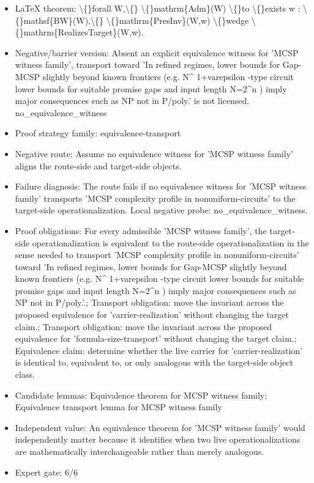 \documentclass[11pt]{article}
\begin{document}
\begin{itemize}
\item LaTeX theorem: \textbackslash\{\}forall W,\textbackslash\{\} \textbackslash\{\}mathrm\{Adm\}(W) \textbackslash\{\}to \textbackslash\{\}exists w : \textbackslash\{\}mathsf\{BW\}(W),\textbackslash\{\} \textbackslash\{\}mathrm\{PresInv\}(W,w) \textbackslash\{\}wedge \textbackslash\{\}mathrm\{RealizesTarget\}(W,w).
\item Negative/barrier version: Absent an explicit equivalence witness for 'MCSP witness family', transport toward 'In refined regimes, lower bounds for Gap-MCSP slightly beyond known frontiers (e.g. N\textasciicircum{} 1+varepsilon -type circuit lower bounds for suitable promise gaps and input length N=2\textasciicircum{}n ) imply major consequences such as NP not in P/poly.' is not licensed. no\_equivalence\_witness
\item Proof strategy family: equivalence-transport
\item Negative route: Assume no equivalence witness for 'MCSP witness family' aligns the route-side and target-side objects.
\item Failure diagnosis: The route fails if no equivalence witness for 'MCSP witness family' transports 'MCSP complexity profile in nonuniform-circuits' to the target-side operationalization. Local negative probe: no\_equivalence\_witness.
\item Proof obligations: For every admissible 'MCSP witness family', the target-side operationalization is equivalent to the route-side operationalization in the sense needed to transport 'MCSP complexity profile in nonuniform-circuits' toward 'In refined regimes, lower bounds for Gap-MCSP slightly beyond known frontiers (e.g. N\textasciicircum{} 1+varepsilon -type circuit lower bounds for suitable promise gaps and input length N=2\textasciicircum{}n ) imply major consequences such as NP not in P/poly.'.; Transport obligation: move the invariant across the proposed equivalence for 'carrier-realization' without changing the target claim.; Transport obligation: move the invariant across the proposed equivalence for 'formula-size-transport' without changing the target claim.; Equivalence claim: determine whether the live carrier for 'carrier-realization' is identical to, equivalent to, or only analogous with the target-side object class.
\item Candidate lemmas: Equivalence theorem for MCSP witness family; Equivalence transport lemma for MCSP witness family
\item Independent value: An equivalence theorem for 'MCSP witness family' would independently matter because it identifies when two live operationalizations are mathematically interchangeable rather than merely analogous.
\item Expert gate: 6/6
\end{itemize}
\end{document}
